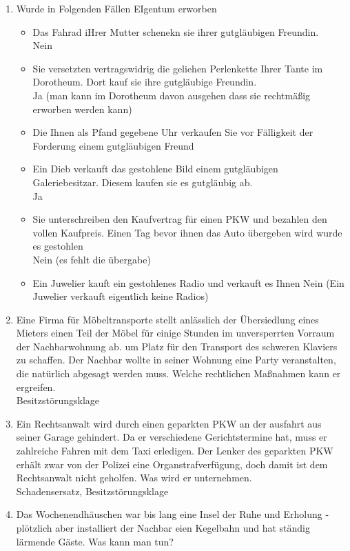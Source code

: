 \documentclass[a4paper]{report}
\begin{document}
\begin{enumerate}
\item Wurde in Folgenden Fällen EIgentum erworben
\begin{itemize}
\item Das Fahrad iHrer Mutter schenekn sie ihrer gutgläubigen Freundin.\\
Nein
\item Sie versetzten vertragswidrig die geliehen Perlenkette Ihrer Tante im Dorotheum. Dort kauf sie ihre gutgläubige Freundin.\\
Ja (man kann im Dorotheum davon ausgehen dass sie rechtmäßig erworben werden kann)
\item Die Ihnen als Pfand gegebene Uhr verkaufen Sie vor Fälligkeit der Forderung einem gutgläubigen Freund 
\item Ein Dieb verkauft das gestohlene Bild einem gutgläubigen Galeriebesitzar. Diesem kaufen sie es gutgläubig ab.\\
Ja
\item Sie unterschreiben den Kaufvertrag für einen PKW und bezahlen den vollen Kaufpreis. Einen Tag bevor ihnen das Auto übergeben wird wurde es gestohlen\\
Nein (es fehlt die übergabe)
\item Ein Juwelier kauft ein gestohlenes Radio und verkauft es Ihnen 
Nein (Ein Juwelier verkauft eigentlich keine Radios)
\end{itemize}
\item Eine Firma für Möbeltransporte stellt anlässlich der Übersiedlung eines Mieters einen Teil der Möbel für einige Stunden im unversperrten Vorraum der Nachbarwohnung ab. um Platz für den Transport des schweren Klaviers zu schaffen. Der Nachbar wollte in seiner Wohnung eine Party veranstalten, die natürlich abgesagt werden muss. Welche rechtlichen Maßnahmen kann er ergreifen.\\
Besitzstörungsklage
\item Ein Rechtsanwalt wird durch einen geparkten PKW an der ausfahrt aus seiner Garage gehindert. Da er verschiedene Gerichtstermine hat, muss er zahlreiche Fahren mit dem Taxi erledigen. Der Lenker des geparkten PKW erhält zwar von der Polizei eine Organstrafverfügung, doch damit ist dem Rechtsanwalt nicht geholfen. Was wird er unternehmen.\\
Schadensersatz, Besitzstörungsklage
\item Das Wochenendhäuschen war bis lang eine Insel der Ruhe und Erholung - plötzlich aber installiert der Nachbar eien Kegelbahn und hat ständig lärmende Gäste. Was kann man tun?\\

\end{enumerate}
\end{document}
